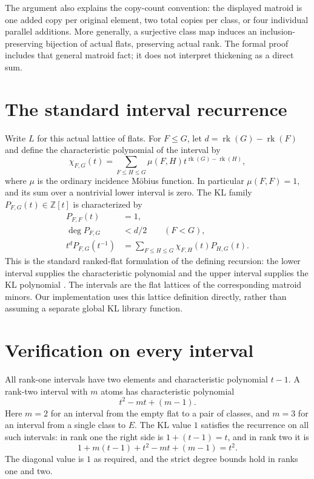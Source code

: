 \documentclass[10pt]{article}
\newcommand{\Z}{\mathbb Z}
\newcommand{\rk}{\operatorname{rk}}
\begin{document}
The argument also explains the copy-count convention: the displayed matroid is one added copy per original element, two total copies per class, or four individual parallel additions. More generally, a surjective class map induces an inclusion-preserving bijection of actual flats, preserving actual rank. The formal proof includes that general matroid fact; it does not interpret thickening as a direct sum.

\newpage
\section{The standard interval recurrence}
Write $L$ for this actual lattice of flats. For $F\le G$, let $d=\rk(G)-\rk(F)$ and define the characteristic polynomial of the interval by
\[
 \chi_{F,G}(t)=\sum_{F\le H\le G}\mu(F,H)t^{\rk(G)-\rk(H)},
\]
where $\mu$ is the ordinary incidence M\"obius function. In particular $\mu(F,F)=1$, and its sum over a nontrivial lower interval is zero. The KL family $P_{F,G}(t)\in\Z[t]$ is characterized by
\begin{align*}
 P_{F,F}(t)&=1,\\
 \deg P_{F,G}&<d/2\qquad(F<G),\\
 t^dP_{F,G}(t^{-1})
   &=\sum_{F\le H\le G}\chi_{F,H}(t)P_{H,G}(t).
\end{align*}
This is the standard ranked-flat formulation of the defining recursion: the lower interval supplies the characteristic polynomial and the upper interval supplies the KL polynomial \cite[pp. 2, 5--6]{epw}. The intervals are the flat lattices of the corresponding matroid minors. Our implementation uses this lattice definition directly, rather than assuming a separate global KL library function.

\section{Verification on every interval}
All rank-one intervals have two elements and characteristic polynomial $t-1$. A rank-two interval with $m$ atoms has characteristic polynomial
\[
 t^2-mt+(m-1).
\]
Here $m=2$ for an interval from the empty flat to a pair of classes, and $m=3$ for an interval from a single class to $E$. The KL value $1$ satisfies the recurrence on all such intervals: in rank one the right side is $1+(t-1)=t$, and in rank two it is
\[
 1+m(t-1)+t^2-mt+(m-1)=t^2.
\]
The diagonal value is $1$ as required, and the strict degree bounds hold in ranks one and two.
\end{document}
